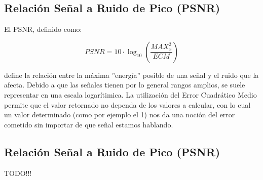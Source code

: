 \subsection {Relaci\'on Señal a Ruido de Pico (PSNR)}

El PSNR, definido como:

$$
\mathit{PSNR} = 10 \cdot \log_{10} \left( \frac{\mathit{MAX}^2_x}{\mathit{ECM}}
\right)
$$

define la relaci\'on entre la m\'axima ''energ\'ia'' posible de una se\~nal y el
ruido que la afecta. Debido a que las se\~nales tienen por lo general rangos
amplios, se suele representar en una escala logar\'itimica. La utilizaci\'on del
 Error Cuadr\'atico Medio permite que el valor retornado no dependa de los
valores a calcular, con lo cual un valor determinado (como por ejemplo el 1) nos
da una noci\'on del error cometido sin importar de que se\~nal estamos hablando.

\subsection{Relaci\'on Se\~nal a Ruido de Pico  (PSNR)}
TODO!!!
